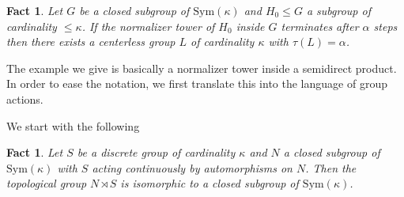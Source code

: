 \documentclass[11pt]{amsart}
\theoremstyle{plain}
\newtheorem{fact}[theorem]{Fact}
\theoremstyle{definition}
\newcounter{step}
\begin{document}
\begin{fact}\label{F: normalizer to automorphism}
Let $G$ be a closed subgroup of $\mathrm{Sym}(\kappa)$ and $H_0\leq G$ a subgroup of cardinality $\leq \kappa$. If the normalizer tower of $H_0$ inside $G$ terminates after $\alpha$ steps then there exists a  centerless group $L$ of cardinality $\kappa$ with $\tau(L)=\alpha$. 
\end{fact}


The example we give is basically a normalizer tower inside a semidirect product. In order to ease the notation, we first translate this into the language of group actions. 

We start with the following
\begin{fact}\label{F:semidirect of nonarchPolish}
    Let $S$ be a discrete group of cardinality $\kappa$ and $N$ a closed subgroup of $\mathrm{Sym}(\kappa)$ with $S$ acting continuously by automorphisms on $N$. Then the topological group $N\rtimes S$ is isomorphic to a closed subgroup of $\mathrm{Sym}(\kappa)$. 
\end{fact}
\end{document}
